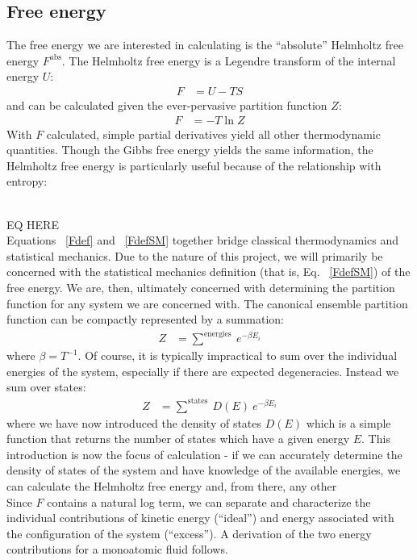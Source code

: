 \documentclass[12pt]{article}
\newcommand{\ignore}[1]{}
\begin{document}
\subsection{Free energy}
The free energy we are interested in calculating is the ``absolute'' Helmholtz free energy $F^{\text{abs}}$. The Helmholtz free energy is a Legendre transform of the internal energy $U$:
\begin{align}
    F &= U - TS
    \label{Fdef}
\end{align}
and can be calculated given the ever-pervasive partition function $Z$:
\begin{align}
    F &= -T \ln Z
    \label{FdefSM}
\end{align}
With $F$ calculated, simple partial derivatives yield all other thermodynamic quantities. Though the Gibbs free energy yields the same information, the Helmholtz free energy is particularly useful because of the relationship with entropy:
\ignore{\begin{align}
    S &= \pdd{F}{T}{V}
\end{align}}
\\EQ HERE\\

Equations ~\ref{Fdef} and ~\ref{FdefSM} together bridge classical thermodynamics and statistical mechanics. Due to the nature of this project, we will primarily be concerned with the statistical mechanics definition (that is, Eq. ~\ref{FdefSM}) of the free energy. We are, then, ultimately concerned with determining the partition function for any system we are concerned with. The canonical ensemble partition function can be compactly represented by a summation:
\begin{align}
    Z &= \sum^{\text{energies}}~e^{-\beta E_i}
\end{align}
where $\beta =  T^{-1}$. Of course, it is typically impractical to sum over the individual energies of the system, especially if there are expected degeneracies. Instead we sum over states:
\begin{align}
    Z &= \sum^{\text{states}}~D(E)~e^{-\beta E_i}
\end{align}
where we have now introduced the density of states $D(E)$ which is a simple function that returns the number of states which have a given energy $E$. This introduction is now the focus of calculation - if we can accurately determine the density of states of the system and have knowledge of the available energies, we can calculate the Helmholtz free energy and, from there, any other  \\   
Since $F$ contains a natural log term, we can separate and characterize the individual contributions of kinetic energy (``ideal'') and energy associated with the configuration of the system (``excess'').  
A derivation of the two energy contributions for a monoatomic fluid follows. \\
\end{document}

